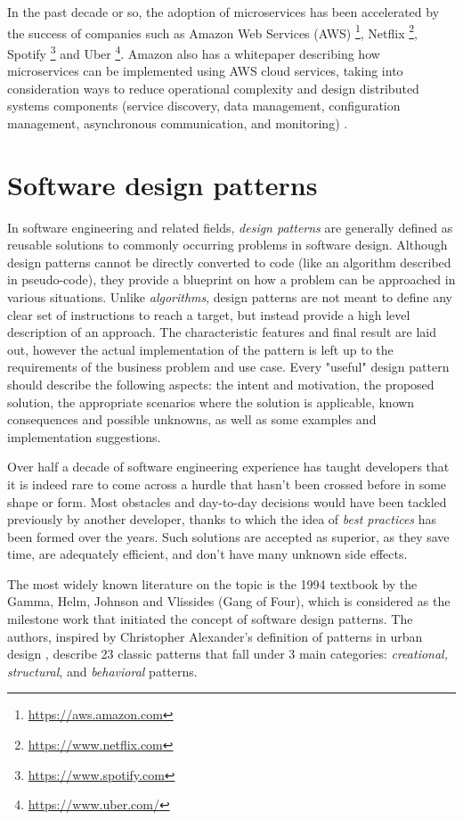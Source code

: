 In the past decade or so, the adoption of microservices has been accelerated by the success of companies such as Amazon Web Services (AWS) \footnote{\url{https://aws.amazon.com}}, Netflix \footnote{\url{https://www.netflix.com}}, Spotify \footnote{\url{https://www.spotify.com}} and Uber \footnote{\url{https://www.uber.com/}}. Amazon also has a whitepaper describing how microservices can be implemented using AWS cloud services, taking into consideration ways to reduce operational complexity and design distributed systems components (service discovery, data management, configuration management, asynchronous communication, and monitoring) \cite{aws-microservices}.

\section{Software design patterns}

In software engineering and related fields, \textit{design patterns} are generally defined as reusable solutions to commonly occurring problems in software design. Although design patterns cannot be directly converted to code (like an algorithm described in pseudo-code), they provide a blueprint on how a problem can be approached in various situations. Unlike \textit{algorithms}, design patterns are not meant to define any clear set of instructions to reach a target, but instead provide a high level description of an approach. The characteristic features and final result are laid out, however the actual implementation of the pattern is left up to the requirements of the business problem and use case. Every "useful" design pattern should describe the following aspects: the intent and motivation, the proposed solution, the appropriate scenarios where the solution is applicable, known consequences and possible unknowns, as well as some examples and implementation suggestions.

Over half a decade of software engineering experience has taught developers that it is indeed rare to come across a hurdle that hasn't been crossed before in some shape or form. Most obstacles and day-to-day decisions would have been tackled previously by another developer, thanks to which the idea of \textit{best practices} has been formed over the years. Such solutions are accepted as superior, as they save time, are adequately efficient, and don't have many unknown side effects.

The most widely known literature on the topic is the 1994 textbook \cite{gof94} by the Gamma, Helm, Johnson and Vlissides (Gang of Four), which is considered as the milestone work that initiated the concept of software design patterns. The authors, inspired by Christopher Alexander's definition of patterns in urban design \cite{alexander77}, describe 23 classic patterns that fall under 3 main categories: \textit{creational, structural}, and \textit{behavioral} patterns. 

